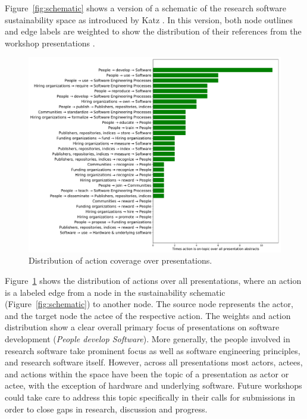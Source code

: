 \documentclass[11pt,letterpaper]{article}
\begin{document}
Figure~\ref{fig:schematic} shows a version of a schematic of the research 
software sustainability space 
as introduced by Katz \cite{katz_research_2018}.
In this version, both node outlines and edge labels are weighted to show the distribution of
their references from the workshop presentations \cite{druskat_activity}.

\begin{figure}[h!]
  \includegraphics[width=\textwidth]{sustainability-actions-plot-resize-jors.pdf}
  \caption{Distribution of action coverage over presentations.}
  \label{fig:actions}
\end{figure}

Figure~\ref{fig:actions} shows the distribution of actions over all presentations, where an action is a labeled edge from a node in the sustainability schematic (Figure~\ref{fig:schematic}) to another node. The source node represents the actor, and the target node the actee of the respective action.
%
The weights and action distribution show a clear overall primary focus of presentations on software development (\textit{People develop Software}). More generally, the people involved in research software take prominent focus as well as software engineering principles, and research software itself. However, across all presentations most actors, actees, and actions within the space have been the topic of a presentation as actor or actee, with the exception of hardware and underlying software. Future workshops could take care to address this topic specifically in their calls for submissions in order to close gaps in research, discussion and progress.
\end{document}
